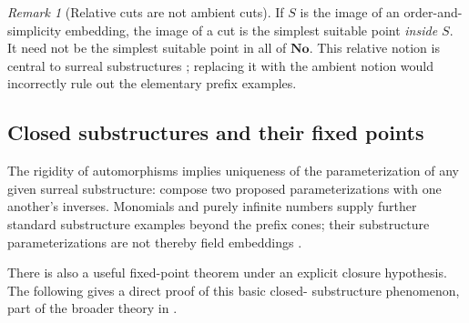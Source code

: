\documentclass[11pt,a4paper]{article}
\numberwithin{equation}{section}
\theoremstyle{plain}
\theoremstyle{definition}
\theoremstyle{remark}
\newtheorem{remark}[theorem]{Remark}
\newcommand{\No}{\mathbf{No}}
\begin{document}
\begin{remark}[Relative cuts are not ambient cuts]
If $S$ is the image of an order-and-simplicity embedding, the image of a cut
is the simplest suitable point \emph{inside $S$}. It need not be the
simplest suitable point in all of $\No$. This relative notion is central
to surreal substructures \cite{BVH}; replacing it with the ambient notion
would incorrectly rule out the elementary prefix examples.
\end{remark}


\subsection{Closed substructures and their fixed points}
The rigidity of automorphisms implies uniqueness of the parameterization
of any given surreal substructure: compose two proposed parameterizations
with one another's inverses. Monomials and purely infinite numbers supply
further standard substructure examples beyond the prefix cones; their
substructure parameterizations are not thereby field embeddings
\cite{Gonshor,BVH}.

There is also a useful fixed-point theorem under an explicit closure
hypothesis. The following gives a direct proof of this basic closed-
substructure phenomenon, part of the broader theory in \cite{BVH}.
\end{document}
